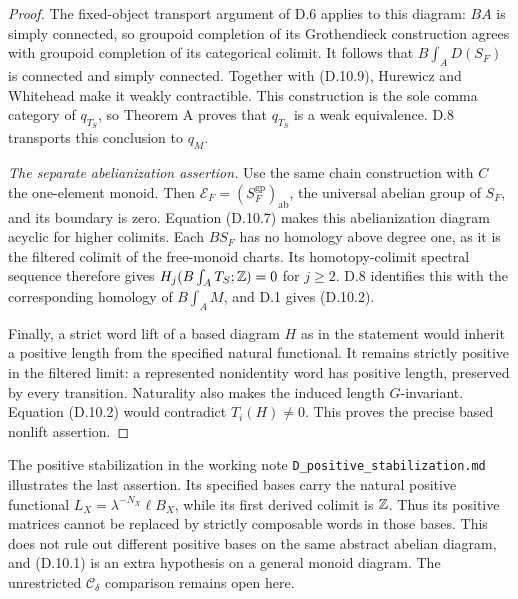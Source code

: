\begin{proof}
The fixed-object transport argument of D.6 applies to this
diagram: $BA$ is simply connected, so groupoid completion of its
Grothendieck construction agrees with groupoid completion of its
categorical colimit. It follows that $B\int_A D(S_F)$ is
connected and simply connected. Together with (D.10.9), Hurewicz
and Whitehead make it weakly contractible. This construction is
the sole comma category of $q_{T_S}$, so Theorem A proves that
$q_{T_S}$ is a weak equivalence. D.8 transports this conclusion
to $q_M$.

\emph{The separate abelianization assertion.}
Use the same chain construction with $C$ the one-element monoid.
Then $\mathscr E_F=(S_F^{\mathrm{gp}})_{\mathrm{ab}}$, the
universal abelian group of $S_F$, and its boundary is zero.
Equation (D.10.7) makes this abelianization diagram acyclic for
higher colimits. Each $BS_F$ has no homology above degree one,
as it is the filtered colimit of the free-monoid charts. Its
homotopy-colimit spectral sequence therefore gives
$H_j(B\int_A T_S;\mathbb Z)=0$ for $j\geq2$. D.8 identifies this
with the corresponding homology of $B\int_A M$, and D.1 gives
(D.10.2).

Finally, a strict word lift of a based diagram $H$ as in the
statement would inherit a positive length from the specified
natural functional. It remains strictly positive in the filtered
limit: a represented nonidentity word has positive length,
preserved by every transition. Naturality also makes the induced
length $G$-invariant. Equation (D.10.2) would contradict
$T_i(H)\ne0$. This proves the precise based nonlift assertion.
\end{proof}

The positive stabilization in the working note
\texttt{D\_positive\_stabilization.md} illustrates the last
assertion. Its specified bases carry the natural positive
functional $L_X=\lambda^{-N_X}\ell B_X$, while its first derived
colimit is $\mathbb Z$. Thus its positive matrices cannot be replaced
by strictly composable words in those bases. This does not rule
out different positive bases on the same abstract abelian diagram,
and (D.10.1) is an extra hypothesis on a general monoid diagram.
The unrestricted $\mathcal C_\delta$ comparison remains open here.
